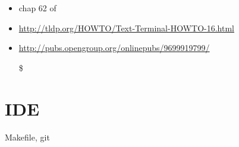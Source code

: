 \begin{itemize}
\item chap 62 of 
\item \url{http://tldp.org/HOWTO/Text-Terminal-HOWTO-16.html}
\item \url{http://pubs.opengroup.org/onlinepubs/9699919799/}
\item[\$] 
\end{itemize}


\section{IDE}
\label{sec:ide}
Makefile, git


